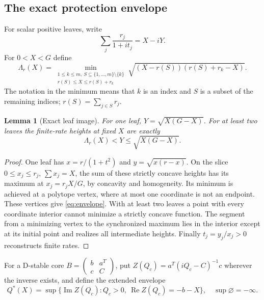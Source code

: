 \documentclass[11pt]{article}
\newtheorem{lemma}[theorem]{Lemma}
\theoremstyle{remark}\newtheorem{remark}[theorem]{Remark}
\newcommand{\Rea}{\operatorname{Re}}\newcommand{\Ima}{\operatorname{Im}}
\begin{document}
\subsection{The exact protection envelope}
For scalar positive leaves, write
\[
 \sum_j\frac{r_j}{1+it_j}=X-iY.
\]
For $0<X<G$ define
\begin{equation}\label{eq:envelope}
 \Lambda_r(X)=\min_{\substack{1\le k\le m,\ S\subseteq\{1,\ldots,m\}\setminus\{k\}\\
 r(S)\le X\le r(S)+r_k}}
 \sqrt{(X-r(S))(r(S)+r_k-X)}.
\end{equation}
The notation in the minimum means that $k$ is an index and $S$ is a
subset of the remaining indices; $r(S)=\sum_{j\in S}r_j$.

\begin{lemma}[Exact leaf image]\label{lem:image}
For one leaf, $Y=\sqrt{X(G-X)}$. For at least two leaves the finite-rate
heights at fixed $X$ are exactly
\[
 \Lambda_r(X)<Y\le\sqrt{X(G-X)}.
\]
\end{lemma}
\begin{proof}
One leaf has $x=r/(1+t^2)$ and $y=\sqrt{x(r-x)}$.
On the slice $0\le x_j\le r_j$, $\sum x_j=X$, the sum of these strictly
concave heights has its maximum at $x_j=r_jX/G$, by concavity and
homogeneity. Its minimum is achieved at a polytope vertex, where at most
one coordinate is not an endpoint. These vertices give \eqref{eq:envelope}.
With at least two leaves a point with every coordinate interior cannot
minimize a strictly concave function. The segment from a minimizing vertex
to the synchronized maximum lies in the interior except at its initial
point and realizes all intermediate heights. Finally $t_j=y_j/x_j>0$
reconstructs finite rates.
\end{proof}

For a D-stable core $B=\left(\begin{smallmatrix}b&a^T\\c&C\end{smallmatrix}\right)$,
put $Z(Q_c)=a^T(iQ_c-C)^{-1}c$ wherever the inverse exists, and define the
extended envelope
\[
 Q^*(X)=\sup\{\Ima Z(Q_c):Q_c>0,\ \Rea Z(Q_c)=-b-X\},
 \quad \sup\varnothing=-\infty.
\]
\end{document}
